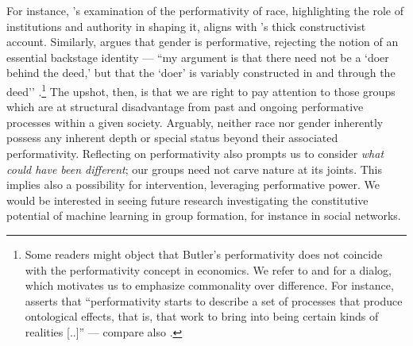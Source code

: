 \documentclass[11pt]{article} %
\begin{document}
For instance, \citeauthor{lee1993racial}'s \citeyearpar{lee1993racial} examination of the performativity of race, highlighting the role of institutions and authority in shaping it, aligns with \citeauthor{hu2021race}'s  \citeyearpar{hu2021race} thick constructivist account.
Similarly, \citet{Butler-trouble} argues that gender is performative, rejecting the notion of an essential backstage identity --- ``my argument is that there need not be a `doer behind the deed,’ but that the `doer' is variably constructed in and through the deed'' \citep{Butler-trouble}.\footnote{Some readers might object that Butler's performativity does not coincide with the performativity concept in economics. We refer to  \citep{butler2010performative} and \citep{callon2010performativity} for a dialog, which motivates us to emphasize commonality over difference. For instance, \citet{butler2010performative} asserts that ``performativity starts to describe a set of processes that produce ontological effects, that is, that work to bring into being certain kinds of realities [..]'' --- compare also \citep[Chapter 2]{mol2002body}.}
The upshot, then, is that we are right to pay attention to those groups which are at structural disadvantage from past and ongoing performative processes within a given society.
Arguably, neither race nor gender inherently possess any inherent depth or special status beyond their associated performativity.
Reflecting on performativity also prompts us to consider \textit{what could have been different}; our groups need not carve nature at its joints. This implies also a possibility for intervention, leveraging performative power. We would be interested in seeing future research investigating the constitutive potential of machine learning in group formation, for instance in social networks.
\end{document}
